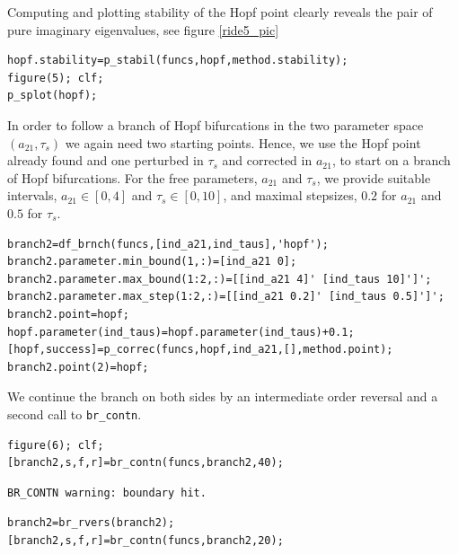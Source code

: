 \documentclass[10pt]{scrartcl}
\newcommand{\blist}[1]{\mbox{\lstinline!#1!}}
\begin{document}
Computing and plotting stability of the Hopf point clearly reveals the pair of pure
imaginary eigenvalues, see figure \ref{ride5_pic} 
\begin{lstlisting}
hopf.stability=p_stabil(funcs,hopf,method.stability);
figure(5); clf;
p_splot(hopf); 
\end{lstlisting} In order to follow a branch of Hopf bifurcations in
the two parameter space $(a_{21},\tau_s)$ we again need two starting
points.  Hence, we use the Hopf point already found and one perturbed
in $\tau_s$ and corrected in $a_{21}$, to start on a branch of Hopf
bifurcations.  For the free parameters, $a_{21}$ and $\tau_s$, we
provide suitable intervals, $a_{21}\in[0,4]$ and $\tau_s\in[0,10]$,
and maximal stepsizes, $0.2$ for $a_{21}$ and $0.5$ for $\tau_s$.
\begin{lstlisting}
branch2=df_brnch(funcs,[ind_a21,ind_taus],'hopf');
branch2.parameter.min_bound(1,:)=[ind_a21 0];
branch2.parameter.max_bound(1:2,:)=[[ind_a21 4]' [ind_taus 10]']';
branch2.parameter.max_step(1:2,:)=[[ind_a21 0.2]' [ind_taus 0.5]']';
branch2.point=hopf;
hopf.parameter(ind_taus)=hopf.parameter(ind_taus)+0.1;          
[hopf,success]=p_correc(funcs,hopf,ind_a21,[],method.point);
branch2.point(2)=hopf; 
\end{lstlisting}
We continue the branch on both sides by an intermediate order
reversal and a second call to \blist{br_contn}.
\begin{lstlisting}
figure(6); clf;
[branch2,s,f,r]=br_contn(funcs,branch2,40);
\end{lstlisting}
{\small
\begin{verbatim}
BR_CONTN warning: boundary hit.
\end{verbatim}
}
\begin{lstlisting}
branch2=br_rvers(branch2);
[branch2,s,f,r]=br_contn(funcs,branch2,20);
\end{lstlisting}
\end{document}
